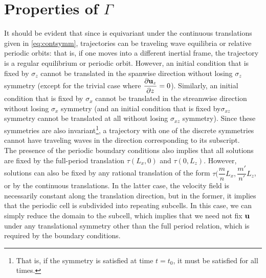 \section{Properties of $\Gamma$}

It should be evident that since \pCf is equivariant under the continuous translations given in \eqref{eq:contsymm}, trajectories can be traveling wave equilibria or relative periodic orbits: that is, if one moves into a different inertial frame, the trajectory is a regular equilibrium or periodic orbit. However, an initial condition that is fixed by $\sigma_z$ cannot be translated in the spanwise direction without losing $\sigma_z$ symmetry (except for the trivial case where $\pder{1}{\Vector{u}_z}{z} = 0$). Similarly, an initial condition that is fixed by $\sigma_x$ cannot be translated in the streamwise direction without losing $\sigma_x$ symmetry (and an initial condition that is fixed by$\sigma_{xz}$ symmetry cannot be translated at all without losing $\sigma_{xz}$ symmetry). Since these symmetries are also invariant\footnote{That is, if the symmetry is satisfied at time $t = t_0$, it must be satisfied for all times.}, a trajectory with one of the discrete symmetries cannot have traveling waves in the direction corresponding to its subscript. \\

The presence of the periodic boundary conditions also implies that all solutions are fixed by the full-period translation $\tau(L_x,0)$ and $\tau(0,L_z)$. However, solutions can also be fixed by any rational translation of the form $\tau(\dfrac{m}{n}L_x,\dfrac{m'}{n'}L_z$, or by the continuous translations. In the latter case, the velocity field is necessarily constant along the translation direction, but in the former, it implies that the periodic cell is subdivided into repeating subcells. In this case, we can simply reduce the domain to the subcell, which implies that we need not fix $\mathbf{u}$ under any translational symmetry other than the full period relation, which is required by the boundary conditions. \\

